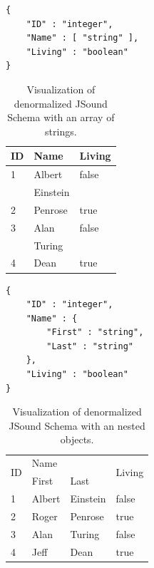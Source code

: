 \begin{minipage}{0.45\textwidth}
\vspace{1\baselineskip}
\begin{lstlisting}[style=json,caption={Denormalized JSound Schema with an array of strings.}]
{
    "ID" : "integer",
    "Name" : [ "string" ],
    "Living" : "boolean"
}   
\end{lstlisting}
\end{minipage}
\hfill
\begin{minipage}{0.45\textwidth}
\begin{table}[H]
    \centering
    \begin{tabular}{|l|l|l|}
        \hline ID & Name & Living \\
        \hline 1 & Albert & false \\
        \cline { 2 - 2 } & Einstein & \\
        \hline 2 & Penrose & true \\
        \hline 3 & Alan & false \\
        \cline { 2 - 2 } & Turing & \\
        \hline 4 & Dean & true \\
        \hline
    \end{tabular}
    \caption{Visualization of denormalized JSound Schema with an array of strings.}
\end{table}
\end{minipage}


\begin{minipage}{0.45\textwidth}
\vspace{1\baselineskip}
\begin{lstlisting}[style=json,caption={Denormalized JSound Schema with nested objects.}]
{
    "ID" : "integer",
    "Name" : {
        "First" : "string",
        "Last" : "string"
    },
    "Living" : "boolean"
}
\end{lstlisting}
\end{minipage}
\hfill
\begin{minipage}{0.45\textwidth}
\begin{table}[H]
    \centering
    \begin{tabular}{|l|l|l|l|}
        \hline \multirow{2}{*}{ ID } & \multicolumn{2}{|l|}{ Name } & \multirow{2}{*}{ Living } \\
        \cline { 2 - 3 } & First & Last & \\
        \hline 1 & Albert & Einstein & false \\
        \hline 2 & Roger & Penrose & true \\
        \hline 3 & Alan & Turing & false \\
        \hline 4 & Jeff & Dean & true \\
        \hline
    \end{tabular}
    \caption{Visualization of denormalized JSound Schema with an nested objects.}
\end{table}
\end{minipage}



